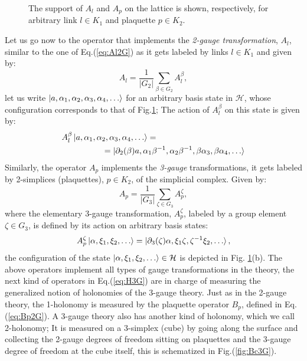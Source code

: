 \documentclass[titlepage,11pt]{article}
\theoremstyle{plain}%
\theoremstyle{definition}
\theoremstyle{remark}
\begin{document}
\begin{figure}[h!]
\centering
{}\hspace{30pt}

\caption{The support of $A_l$ and $A_p$ on the lattice is shown, respectively, for arbitrary link $l \in K_1$ and plaquette $p \in K_2$.}
\label{fig:Al3G}
\end{figure}

Let us go now to the operator that implements the \emph{2-gauge transformation}, $A_l$, similar to the one of Eq.(\ref{eq:Al2G}) as it gets labeled by links $l \in K_1$ and given by:
\begin{equation}\label{eq:Al3G}
A_l=\dfrac{1}{|G_2|}\sum_{\beta \in G_2} A_l^{\beta},
\end{equation}
let us write $\ket{ a, \alpha_1,\alpha_2,\alpha_3,\alpha_4, \dots}$ for an arbitrary basis state in $\mathcal{H}$, whose configuration corresponds to that of Fig.\ref{fig:Al3G}; The action of $A_l^\beta$ on this state is given by:
\begin{align*}
A_l^{\beta}\ket{a, \alpha_1,\alpha_2,\alpha_3, \alpha_4, \dots} &= \\ & \hspace{-55pt} = \ket{\partial_{2}(\beta)a, \alpha_1\beta^{-1},\alpha_2\beta^{-1},\beta\alpha_3,\beta\alpha_4, \dots}
\end{align*}
Similarly, the operator $A_p$ implements the \emph{3-gauge} transformations, it gets labeled by 2-simplices (plaquettes), $p \in K_2$, of the simplicial complex. Given by:
\begin{equation}
A_p=\dfrac{1}{|G_3|}\sum_{\zeta \in G_3}A_p^{\zeta},
\end{equation} 
where the elementary 3-gauge transformation, $A_p^{\zeta}$, labeled by a group element $\zeta \in G_3$, is defined by its action on arbitrary basis states:
\begin{align*}
A_p^{\zeta}\ket{\alpha, \xi_1, \xi_2, \dots}= \ket{\partial_3(\zeta)\alpha, \xi_1\zeta, \zeta^{-1}\xi_2, \dots},
\end{align*}
the configuration of the state $\ket{ \alpha, \xi_1, \xi_2, \dots} \in \mathcal{H}$ is depicted in Fig. \ref{fig:Al3G}(b).
The above operators implement all types of gauge transformations in the theory, the next kind of operators in Eq.(\ref{eq:H3G}) are in charge of measuring the generalized notion of holonomies of the 3-gauge theory. Just as in the 2-gauge theory, the 1-holonomy is measured by the plaquette operator $B_p$, defined in Eq.(\ref{eq:Bp2G}). A 3-gauge theory also has another kind of holonomy, which we call 2-holonomy; It is measured on a 3-simplex (cube) by going along the surface and collecting the 2-gauge degrees of freedom sitting on plaquettes and the 3-gauge degree of freedom at the cube itself, this is schematized in Fig.(\ref{fig:Bc3G}). 
\end{document}
